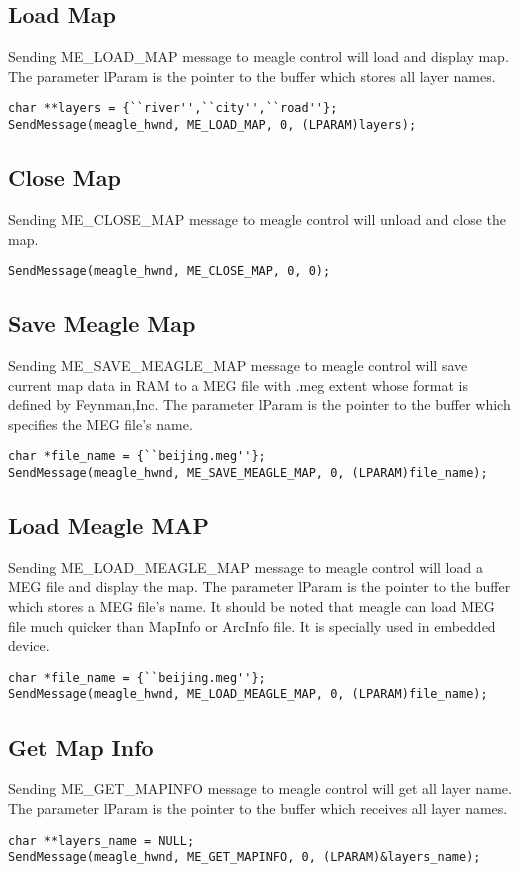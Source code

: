 \documentclass[a4paper]{article}
\begin{document}
\subsection{Load Map}
Sending ME\_LOAD\_MAP message to meagle control will load and display map. The parameter lParam is the pointer to the buffer which stores all layer names. 
\begin{lstlisting}
char **layers = {``river'',``city'',``road''};
SendMessage(meagle_hwnd, ME_LOAD_MAP, 0, (LPARAM)layers);
\end{lstlisting}

\subsection{Close Map}
Sending ME\_CLOSE\_MAP message to meagle control will  unload and close the map.
\begin{lstlisting}
SendMessage(meagle_hwnd, ME_CLOSE_MAP, 0, 0);
\end{lstlisting}

\subsection{Save Meagle Map}
Sending ME\_SAVE\_MEAGLE\_MAP message to meagle control will save current map data in RAM to a MEG file with .meg extent whose format is defined by Feynman,Inc.  The parameter lParam is the pointer to the buffer which specifies the MEG file's name. 
\begin{lstlisting}
char *file_name = {``beijing.meg''};
SendMessage(meagle_hwnd, ME_SAVE_MEAGLE_MAP, 0, (LPARAM)file_name);
\end{lstlisting}

\subsection{Load Meagle MAP}
Sending ME\_LOAD\_MEAGLE\_MAP message to meagle control will load a MEG file and display the map. The parameter lParam is the pointer to the buffer which stores a MEG file's name. It should be noted that meagle can load MEG file much quicker than MapInfo or ArcInfo file. It is specially used in embedded device.   
\begin{lstlisting}
char *file_name = {``beijing.meg''};
SendMessage(meagle_hwnd, ME_LOAD_MEAGLE_MAP, 0, (LPARAM)file_name);
\end{lstlisting}

\subsection{Get Map Info}
Sending ME\_GET\_MAPINFO message to meagle control will get all layer name. The parameter lParam is the pointer to the buffer which receives all layer names. 
\begin{lstlisting}
char **layers_name = NULL;
SendMessage(meagle_hwnd, ME_GET_MAPINFO, 0, (LPARAM)&layers_name);
\end{lstlisting}
\end{document}
